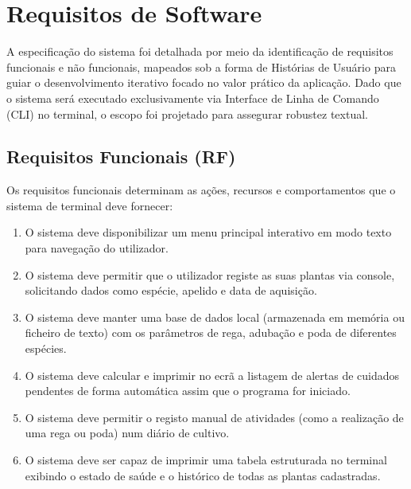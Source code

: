 \documentclass[a4paper,12pt]{article}
\begin{document}
\section{Requisitos de Software}

A especificação do sistema foi detalhada por meio da identificação de requisitos funcionais e não funcionais, mapeados sob a forma de Histórias de Usuário para guiar o desenvolvimento iterativo focado no valor prático da aplicação. Dado que o sistema será executado exclusivamente via Interface de Linha de Comando (CLI) no terminal, o escopo foi projetado para assegurar robustez textual.

\subsection{Requisitos Funcionais (RF)}
Os requisitos funcionais determinam as ações, recursos e comportamentos que o sistema de terminal deve fornecer:
\begin{enumerate}[label=\textbf{RF\arabic*}]
    \item O sistema deve disponibilizar um menu principal interativo em modo texto para navegação do utilizador.
    \item O sistema deve permitir que o utilizador registe as suas plantas via console, solicitando dados como espécie, apelido e data de aquisição.
    \item O sistema deve manter uma base de dados local (armazenada em memória ou ficheiro de texto) com os parâmetros de rega, adubação e poda de diferentes espécies.
    \item O sistema deve calcular e imprimir no ecrã a listagem de alertas de cuidados pendentes de forma automática assim que o programa for iniciado.
    \item O sistema deve permitir o registo manual de atividades (como a realização de uma rega ou poda) num diário de cultivo.
    \item O sistema deve ser capaz de imprimir uma tabela estruturada no terminal exibindo o estado de saúde e o histórico de todas as plantas cadastradas.
\end{enumerate}
\end{document}
